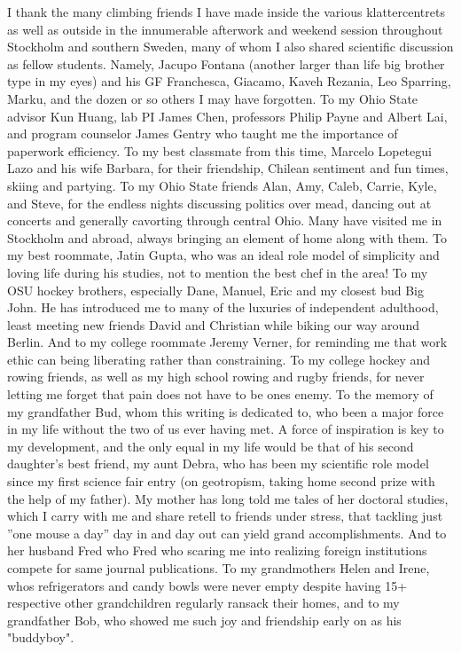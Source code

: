 I thank the many climbing friends I have made inside the various klattercentrets as well as outside in the innumerable afterwork and weekend session throughout Stockholm and southern Sweden, many of whom I also shared scientific discussion as fellow students. Namely, Jacupo Fontana (another larger than life big brother type in my eyes) and his GF Franchesca, Giacamo, Kaveh Rezania, Leo Sparring, Marku, and the dozen or so others I may have forgotten.
To my Ohio State advisor Kun Huang, lab PI James Chen, professors Philip Payne and Albert Lai, and program counselor James Gentry who taught me the importance of paperwork efficiency. To my best classmate from this time, Marcelo Lopetegui Lazo and his wife Barbara, for their friendship, Chilean sentiment and fun times, skiing and partying. To my Ohio State friends Alan, Amy, Caleb, Carrie, Kyle, and Steve, for the endless nights discussing politics over mead, dancing out at concerts and generally cavorting through central Ohio. Many have visited me in Stockholm and abroad, always bringing an element of home along with them. To my best roommate, Jatin Gupta, who was an ideal role model of simplicity and loving life during his studies, not to mention the best chef in the area! To my OSU hockey brothers, especially Dane, Manuel, Eric and my closest bud Big John. He has introduced me to many of the luxuries of independent adulthood, least meeting new friends David and Christian while biking our way around Berlin. And to my college roommate Jeremy Verner, for reminding me that work ethic can being liberating rather than constraining. To my college hockey and rowing friends, as well as my high school rowing and rugby friends, for never letting me forget that pain does not have to be ones enemy.
To the memory of my grandfather Bud, whom this writing is dedicated to, who been a major force in my life without the two of us ever having met. A force of inspiration is key to my development, and the only equal in my life would be that of his second daughter's best friend, my aunt Debra, who has been my scientific role model since my first science fair entry (on geotropism, taking home second prize with the help of my father). My mother has long told me tales of her doctoral studies, which I carry with me and share retell to friends under stress, that tackling just ''one mouse a day'' day in and day out can yield grand accomplishments. And to her husband Fred who Fred who scaring me into realizing foreign institutions compete for same journal publications. To my grandmothers Helen and Irene, whos refrigerators and candy bowls were never empty despite having 15+ respective other grandchildren regularly ransack their homes, and to my grandfather Bob, who showed me such joy and friendship early on as his "buddyboy".

